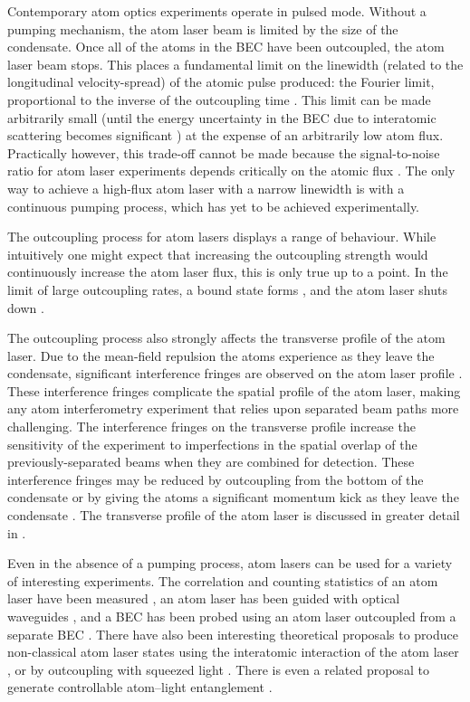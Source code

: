 Contemporary atom optics experiments operate in pulsed mode.  Without a pumping mechanism, the atom laser beam is limited by the size of the condensate.  Once all of the atoms in the BEC have been outcoupled, the atom laser beam stops.  This places a fundamental limit on the linewidth (related to the longitudinal velocity-spread) of the atomic pulse produced: the Fourier limit, proportional to the inverse of the outcoupling time \citep{Johnsson:2007}.  This limit can be made arbitrarily small (until the energy uncertainty in the BEC due to interatomic scattering becomes significant \cite{Johnsson:2007a}) at the expense of an arbitrarily low atom flux.  Practically however, this trade-off cannot be made because the signal-to-noise ratio for atom laser experiments depends critically on the atomic flux \citep{Dowling:1998}.  The only way to achieve a high-flux atom laser with a narrow linewidth is with a continuous pumping process, which has yet to be achieved experimentally. 

The outcoupling process for atom lasers displays a range of behaviour.  While intuitively one might expect that increasing the outcoupling strength would continuously increase the atom laser flux, this is only true up to a point.  In the limit of large outcoupling rates, a bound state forms \citep{Jeffers:2000rr}, and the atom laser shuts down \citep{Robins:2004pz}.  

The outcoupling process also strongly affects the transverse profile of the atom laser.  Due to the mean-field repulsion the atoms experience as they leave the condensate, significant interference fringes are observed on the atom laser profile \citep{Busch:2002zr,Kohl:2005fk}.  These interference fringes complicate the spatial profile of the atom laser, making any atom interferometry experiment that relies upon separated beam paths more challenging.  The interference fringes on the transverse profile increase the sensitivity of the experiment to imperfections in the spatial overlap of the previously-separated beams when they are combined for detection.  These interference fringes may be reduced by outcoupling from the bottom of the condensate \citep{Riou:2006uq} or by giving the atoms a significant momentum kick as they leave the condensate \citep{Jeppesen:2008}.  The transverse profile of the atom laser is discussed in greater detail in .

Even in the absence of a pumping process, atom lasers can be used for a variety of interesting experiments.  The correlation and counting statistics of an atom laser have been measured \citep{Ottl:2005}, an atom laser has been guided with optical waveguides \citep{Guerin:2006mz}, and a BEC has been probed using an atom laser outcoupled from a separate BEC \citep{Doring:2008}.  There have also been interesting theoretical proposals to produce non-classical atom laser states using the interatomic interaction of the atom laser \citep{Johnsson:2007b}, or by outcoupling with squeezed light \citep{Haine:2005}.  There is even a related proposal to generate controllable atom--light entanglement \citep{Haine:2006}.

